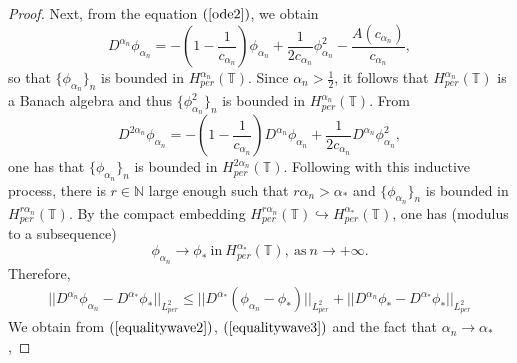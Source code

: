 \documentclass[12pt,reqno]{amsart}
\newcommand{\2}{L^2_{per}(0, T)}
\numberwithin{equation}{section}
\numberwithin{figure}{section}
\begin{document}
\begin{proof}
	\indent Next, from the equation $(\ref{ode2})$, we obtain
	$$
	 D^{\alpha_n}\phi_{\alpha_n}=-\left(1-\frac{1}{c_{\alpha_{n}}}\right)\phi_{\alpha_{n}}+\frac{1}{2c_{\alpha_n}}\phi_{\alpha_{n}}^2-\frac{A(c_{\alpha_{n}})}{c_{\alpha_n}},
	$$
	so that $\{\phi_{\alpha_{n}}\}_n$ is bounded in $H_{per}^{\alpha_{n}}(\mathbb{T})$. Since $\alpha_{n}>\frac{1}{2}$, it follows  that $H_{per}^{\alpha_{n}}(\mathbb{T})$ is a Banach algebra and thus $\{\phi_{\alpha_{n}}^2\}_{n}$ is bounded in $H_{per}^{\alpha_{n}}(\mathbb{T})$. From
		\begin{equation}\label{equalitywave1}
	D^{2\alpha_n}\phi_{\alpha_n}=-\left(1-\frac{1}{c_{\alpha_{n}}}\right)	 D^{\alpha_n}\phi_{\alpha_{n}}+\frac{1}{2c_{\alpha_n}}	D^{\alpha_n}\phi_{\alpha_{n}}^2,
	\end{equation}
	one has that $\{\phi_{\alpha_{n}}\}_n$ is bounded in $H_{per}^{2\alpha_{n}}(\mathbb{T})$. Following with this inductive process, there is $r\in\mathbb{N}$ large enough such that $r\alpha_{n}>\alpha_{*}$ and $\{\phi_{\alpha_{n}}\}_n$ is bounded in $H_{per}^{r\alpha_{n}}(\mathbb{T})$. By the compact embedding $H_{per}^{r\alpha_{n}}(\mathbb{T})\hookrightarrow H_{per}^{\alpha_{*}}(\mathbb{T})$, one has (modulus to a subsequence)
	\begin{equation}\label{equalitywave2}
	\phi_{\alpha_n}\rightarrow\phi_{*}\ \mbox{in}\ H_{per}^{\alpha_*}(\mathbb{T}),\ \mbox{as}\ n\rightarrow+\infty.
	\end{equation}
	Therefore,
	\begin{equation}\label{equalitywave3}\begin{array}{llll}
	||D^{\alpha_n}\phi_{\alpha_n}-D^{\alpha_{*}}\phi_{{*}}||_{L_{per}^2}
	\leq
	||D^{\alpha_*}(\phi_{\alpha_n}-\phi_{{*}})||_{L_{per}^2}+
	||D^{\alpha_n}\phi_{*}-D^{\alpha_{*}}\phi_{{*}}||_{L_{per}^2}
	\end{array}
	\end{equation}
	We obtain from $(\ref{equalitywave2})$, $(\ref{equalitywave3})$ and the fact that $\alpha_{n}\rightarrow\alpha_{*}$,
	

\end{proof}
\end{document}
